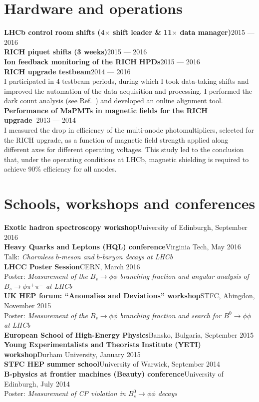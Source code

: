 \documentclass[contbibnum,titleabove]{simplecv}
\newcommand\dateditem[2]{#1\hfill#2\\}
\newcommand\topictitle[3]{\dateditem{{\textbf{#1}}}{#3}#2}
\begin{document}
	\section{Hardware and operations}
	\topictitle{LHCb control room shifts (4$\times$ shift leader \& 11$\times$ data manager)}{}{2015 --- 2016}
	\topictitle{RICH piquet shifts (3 weeks)}{}{2015 --- 2016}
	\topictitle{Ion feedback monitoring of the RICH HPDs}{}{2015 --- 2016}
	\topictitle{RICH upgrade testbeam}{}{2014 --- 2016}
	I participated in 4 testbeam periods, during which I took data-taking shifts and improved the automation of the data acquisition and processing. I performed the dark count analysis (see Ref.~\cite{testbeam}) and developed an online alignment tool.
	\topictitle{Performance of MaPMTs in magnetic fields for the RICH upgrade~\cite{mapmt}}{}{2013 --- 2014}
	I measured the drop in efficiency of the multi-anode photomultipliers, selected for the RICH upgrade, as a function of magnetic field strength applied along different axes for different operating voltages.
	This study led to the conclusion that, under the operating conditions at LHCb, magnetic shielding is required to achieve 90\% efficiency for all anodes.
	\section{Schools, workshops and conferences}
	\topictitle{Exotic hadron spectroscopy workshop}{}{University of Edinburgh, September 2016}
	\topictitle{Heavy Quarks and Leptons (HQL) conference}{Talk: \textit{Charmless $b$-meson and $b$-baryon decays at LHCb}~\cite{HQL}}{Virginia Tech, May 2016}\\
	\topictitle{LHCC Poster Session}{Poster: \textit{Measurement of the $B_s \to \phi \phi$ branching fraction and angular analysis of $B_s \to \phi \pi^{+} \pi^{-}$ at LHCb}}{CERN, March 2016}\\
	\topictitle{UK HEP forum: ``Anomalies and Deviations'' workshop}{Poster: \textit{Measurement of the $B_s \to \phi \phi$ branching fraction and search for $B^0 \to \phi \phi$ at LHCb}}{STFC, Abingdon, November 2015}\\
	\topictitle{European School of High-Energy Physics}{}{Bansko, Bulgaria, September 2015}
	\topictitle{Young Experimentalists and Theorists Institute (YETI) workshop}{}{Durham University, January 2015}
	\topictitle{STFC HEP summer school}{}{University of Warwick, September 2014}
	\topictitle{B-physics at frontier machines (Beauty) conference}{Poster: \textit{Measurement of CP violation in $B^0_s \to \phi\phi$ decays~\cite{beauty}}}{University of Edinburgh, July 2014}
\end{document}
